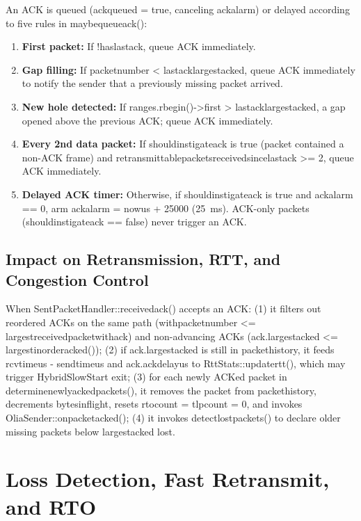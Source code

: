 \documentclass[10pt,a4paper]{article}
\newcommand{\codeul}{\textunderscore\hspace{0pt}}
\DeclareRobustCommand{\code}[1]{{\ttfamily\let\_\codeul #1}}
\begin{document}
An ACK is queued (\code{ack\_queued = true}, canceling \code{ack\_alarm}) or delayed according to five rules in \code{maybe\_queue\_ack()}:
\begin{enumerate}
    \item \textbf{First packet:} If \code{!has\_last\_ack}, queue ACK immediately.
    \item \textbf{Gap filling:} If \code{packet\_number < last\_ack\_largest\_acked}, queue ACK immediately to notify the sender that a previously missing packet arrived.
    \item \textbf{New hole detected:} If \code{ranges.rbegin()->first > last\_ack\_largest\_acked}, a gap opened above the previous ACK; queue ACK immediately.
    \item \textbf{Every 2nd data packet:} If \code{should\_instigate\_ack} is true (packet contained a non-ACK frame) and \code{retransmittable\_packets\_received\_since\_last\_ack >= 2}, queue ACK immediately.
    \item \textbf{Delayed ACK timer:} Otherwise, if \code{should\_instigate\_ack} is true and \code{ack\_alarm == 0}, arm \code{ack\_alarm = now\_us + 25000} (25~ms). ACK-only packets (\code{should\_instigate\_ack == false}) never trigger an ACK.
\end{enumerate}

\subsection{Impact on Retransmission, RTT, and Congestion Control}
When \code{SentPacketHandler::received\_ack()} accepts an ACK: (1) it filters out reordered ACKs on the same path (\code{with\_packet\_number <= largest\_received\_packet\_with\_ack}) and non-advancing ACKs (\code{ack.largest\_acked <= largest\_in\_order\_acked()}); (2) if \code{ack.largest\_acked} is still in \code{packet\_history}, it feeds \code{rcv\_time\_us - send\_time\_us} and \code{ack.ack\_delay\_us} to \code{RttStats::update\_rtt()}, which may trigger \code{HybridSlowStart} exit; (3) for each newly ACKed packet in \code{determine\_newly\_acked\_packets()}, it removes the packet from \code{packet\_history}, decrements \code{bytes\_in\_flight}, resets \code{rto\_count = tlp\_count = 0}, and invokes \code{OliaSender::on\_packet\_acked()}; (4) it invokes \code{detect\_lost\_packets()} to declare older missing packets below \code{largest\_acked} lost.

\section{Loss Detection, Fast Retransmit, and RTO}
\end{document}
